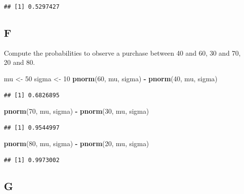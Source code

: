 \documentclass[
]{article}
\newenvironment{Shaded}{\begin{snugshade}}{\end{snugshade}}
\newcommand{\DecValTok}[1]{\textcolor[rgb]{0.00,0.00,0.81}{#1}}
\newcommand{\KeywordTok}[1]{\textcolor[rgb]{0.13,0.29,0.53}{\textbf{#1}}}
\newcommand{\NormalTok}[1]{#1}
\newcommand{\OperatorTok}[1]{\textcolor[rgb]{0.81,0.36,0.00}{\textbf{#1}}}
\newcommand{\StringTok}[1]{\textcolor[rgb]{0.31,0.60,0.02}{#1}}
\begin{document}
\begin{verbatim}
## [1] 0.5297427
\end{verbatim}

\hypertarget{f}{%
\subsection{F}\label{f}}

Compute the probabilities to observe a purchase between 40 and 60, 30
and 70, 20 and 80.

\begin{Shaded}
\begin{Highlighting}[]
\NormalTok{mu \textless{}{-}}\StringTok{ }\DecValTok{50}
\NormalTok{sigma \textless{}{-}}\StringTok{ }\DecValTok{10}
\KeywordTok{pnorm}\NormalTok{(}\DecValTok{60}\NormalTok{, mu, sigma) }\OperatorTok{{-}}\StringTok{ }\KeywordTok{pnorm}\NormalTok{(}\DecValTok{40}\NormalTok{, mu, sigma)}
\end{Highlighting}
\end{Shaded}

\begin{verbatim}
## [1] 0.6826895
\end{verbatim}

\begin{Shaded}
\begin{Highlighting}[]
\KeywordTok{pnorm}\NormalTok{(}\DecValTok{70}\NormalTok{, mu, sigma) }\OperatorTok{{-}}\StringTok{ }\KeywordTok{pnorm}\NormalTok{(}\DecValTok{30}\NormalTok{, mu, sigma)}
\end{Highlighting}
\end{Shaded}

\begin{verbatim}
## [1] 0.9544997
\end{verbatim}

\begin{Shaded}
\begin{Highlighting}[]
\KeywordTok{pnorm}\NormalTok{(}\DecValTok{80}\NormalTok{, mu, sigma) }\OperatorTok{{-}}\StringTok{ }\KeywordTok{pnorm}\NormalTok{(}\DecValTok{20}\NormalTok{, mu, sigma)}
\end{Highlighting}
\end{Shaded}

\begin{verbatim}
## [1] 0.9973002
\end{verbatim}

\hypertarget{g}{%
\subsection{G}\label{g}}
\end{document}
